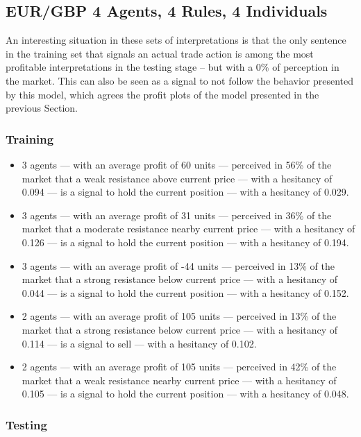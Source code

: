 \subsection{EUR/GBP 4 Agents, 4 Rules, 4 Individuals}
\label{}

An interesting situation in these sets of interpretations is that the only sentence in the training set that signals an actual trade action is among the most profitable interpretations in the testing stage -- but with a 0\% of perception in the market. This can also be seen as a signal to not follow the behavior presented by this model, which agrees the profit plots of the model presented in the previous Section.

\subsubsection{Training}
\label{}

{\small
  \begin{itemize}
  \item 3 agents — with an average profit of 60 units — perceived in 56\% of the
    market that a weak resistance above current price — with a hesitancy of
    0.094 — is a signal to hold the current position — with a hesitancy of
    0.029.
  \item 3 agents — with an average profit of 31 units — perceived in 36\% of the
    market that a moderate resistance nearby current price — with a hesitancy of
    0.126 — is a signal to hold the current position — with a hesitancy of
    0.194.
  \item 3 agents — with an average profit of -44 units — perceived in 13\% of
    the market that a strong resistance below current price — with a hesitancy
    of 0.044 — is a signal to hold the current position — with a hesitancy of
    0.152.
  \item 2 agents — with an average profit of 105 units — perceived in 13\% of
    the market that a strong resistance below current price — with a hesitancy
    of 0.114 — is a signal to sell — with a hesitancy of 0.102.
  \item 2 agents — with an average profit of 105 units — perceived in 42\% of
    the market that a weak resistance nearby current price — with a hesitancy of
    0.105 — is a signal to hold the current position — with a hesitancy of
    0.048.
  \end{itemize}
}

\subsubsection{Testing}
\label{}

